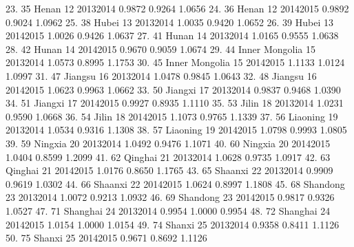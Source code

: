 23. {\VBAR}  35            Henan   12   2013{\tytilde}2014   0.9872   0.9264   1.0656 {\VBAR}
24. {\VBAR}  36            Henan   12   2014{\tytilde}2015   0.9892   0.9024   1.0962 {\VBAR}
25. {\VBAR}  38            Hubei   13   2013{\tytilde}2014   1.0035   0.9420   1.0652 {\VBAR}
26. {\VBAR}  39            Hubei   13   2014{\tytilde}2015   1.0026   0.9426   1.0637 {\VBAR}
27. {\VBAR}  41            Hunan   14   2013{\tytilde}2014   1.0165   0.9555   1.0638 {\VBAR}
28. {\VBAR}  42            Hunan   14   2014{\tytilde}2015   0.9670   0.9059   1.0674 {\VBAR}
29. {\VBAR}  44   Inner Mongolia   15   2013{\tytilde}2014   1.0573   0.8995   1.1753 {\VBAR}
30. {\VBAR}  45   Inner Mongolia   15   2014{\tytilde}2015   1.1133   1.0124   1.0997 {\VBAR}
31. {\VBAR}  47          Jiangsu   16   2013{\tytilde}2014   1.0478   0.9845   1.0643 {\VBAR}
32. {\VBAR}  48          Jiangsu   16   2014{\tytilde}2015   1.0623   0.9963   1.0662 {\VBAR}
33. {\VBAR}  50          Jiangxi   17   2013{\tytilde}2014   0.9837   0.9468   1.0390 {\VBAR}
34. {\VBAR}  51          Jiangxi   17   2014{\tytilde}2015   0.9927   0.8935   1.1110 {\VBAR}
35. {\VBAR}  53            Jilin   18   2013{\tytilde}2014   1.0231   0.9590   1.0668 {\VBAR}
36. {\VBAR}  54            Jilin   18   2014{\tytilde}2015   1.1073   0.9765   1.1339 {\VBAR}
37. {\VBAR}  56         Liaoning   19   2013{\tytilde}2014   1.0534   0.9316   1.1308 {\VBAR}
38. {\VBAR}  57         Liaoning   19   2014{\tytilde}2015   1.0798   0.9993   1.0805 {\VBAR}
39. {\VBAR}  59          Ningxia   20   2013{\tytilde}2014   1.0492   0.9476   1.1071 {\VBAR}
40. {\VBAR}  60          Ningxia   20   2014{\tytilde}2015   1.0404   0.8599   1.2099 {\VBAR}
41. {\VBAR}  62          Qinghai   21   2013{\tytilde}2014   1.0628   0.9735   1.0917 {\VBAR}
42. {\VBAR}  63          Qinghai   21   2014{\tytilde}2015   1.0176   0.8650   1.1765 {\VBAR}
43. {\VBAR}  65          Shaanxi   22   2013{\tytilde}2014   0.9909   0.9619   1.0302 {\VBAR}
44. {\VBAR}  66          Shaanxi   22   2014{\tytilde}2015   1.0624   0.8997   1.1808 {\VBAR}
45. {\VBAR}  68         Shandong   23   2013{\tytilde}2014   1.0072   0.9213   1.0932 {\VBAR}
46. {\VBAR}  69         Shandong   23   2014{\tytilde}2015   0.9817   0.9326   1.0527 {\VBAR}
47. {\VBAR}  71         Shanghai   24   2013{\tytilde}2014   0.9954   1.0000   0.9954 {\VBAR}
48. {\VBAR}  72         Shanghai   24   2014{\tytilde}2015   1.0154   1.0000   1.0154 {\VBAR}
49. {\VBAR}  74           Shanxi   25   2013{\tytilde}2014   0.9358   0.8411   1.1126 {\VBAR}
50. {\VBAR}  75           Shanxi   25   2014{\tytilde}2015   0.9671   0.8692   1.1126 {\VBAR}
